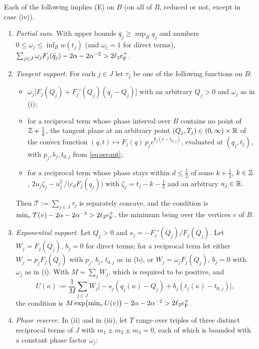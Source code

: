 \begin{lemma}\label{lem:energy}
Each of the following implies \textup{(E)} on $B$ (on all of $B$, reduced or not, except in case \textup{(iv)}).
\begin{enumerate}
\item[\textup{(i)}] \emph{Partial sum.} With upper bounds $\bar q_j\ge\sup_Bq_j$ and numbers $0\le\omega_j\le\inf_Bw(t_j)$ (and
$\omega_j=1$ for direct terms),
$\sum_{j\in J}\omega_jF_j(\bar q_j)-2\alpha-2\alpha^{-2}>2\ell_2e_{\mathrm F}^+$.
\item[\textup{(ii)}] \emph{Tangent support.} For each $j\in J$ let $\tau_j$ be one of the following functions on $B$:
\begin{itemize}
\item[(a)] $\omega_j\bigl[F_j(Q_j)+F_j'(Q_j)(q_j-Q_j)\bigr]$ with an arbitrary $Q_j>0$ and $\omega_j$ as in \textup{(i)};
\item[(b)] for a reciprocal term whose phase interval over $B$ contains no point of $\mathbb Z+\frac12$, the tangent plane at an arbitrary
point $(Q_j,T_j)\in(0,\infty)\times\mathbb R$ of the convex function $(q,t)\mapsto F_j(q)\,p_je^{b_j(t-t_{0,j})}$, evaluated at $(q_j,t_j)$,
with $p_j,b_j,t_{0,j}$ from \eqref{eq:secant};
\item[(c)] for a reciprocal term whose phase stays within $d\le\frac12$ of some $k+\frac12$, $k\in\mathbb Z$,
$2u_j\zeta_j-u_j^2\,/\bigl(c_dF_j(q_j)\bigr)$ with $\zeta_j=t_j-k-\frac12$ and an arbitrary $u_j\in\mathbb R$.
\end{itemize}
Then $\mathcal T:=\sum_{j\in J}\tau_j$ is separately concave, and the condition is
$\min_{v}\mathcal T(v)-2\alpha-2\alpha^{-2}>2\ell_2e_{\mathrm F}^+$, the minimum being over the vertices $v$ of $B$.
\item[\textup{(iii)}] \emph{Exponential support.} Let $Q_j>0$ and $s_j=-F_j'(Q_j)/F_j(Q_j)$. Let $W_j=F_j(Q_j)$, $b_j=0$ for direct terms;
for a reciprocal term let either $W_j=p_jF_j(Q_j)$ with $p_j$, $b_j$, $t_{0,j}$ as in \textup{(b)}, or $W_j=\omega_jF_j(Q_j)$, $b_j=0$
with $\omega_j$ as in \textup{(i)}. With $M=\sum_jW_j$, which is required to be positive, and
\[
  U(\kappa):=\frac1M\sum_{j\in J}W_j\bigl[-s_j(q_j(\kappa)-Q_j)+b_j(t_j(\kappa)-t_{0,j})\bigr],
\]
the condition is $M\exp\bigl(\min_vU(v)\bigr)-2\alpha-2\alpha^{-2}>2\ell_2e_{\mathrm F}^+$.
\item[\textup{(iii$'$)}] \emph{Phase reserve.} In \textup{(ii)} and in \textup{(iii)}, let $T$ range over triples of three distinct
reciprocal terms of $J$ with $m_1\pm m_2\pm m_3=0$, each of which is bounded with a constant phase factor $\omega_j$:

\end{enumerate}
\end{lemma}
